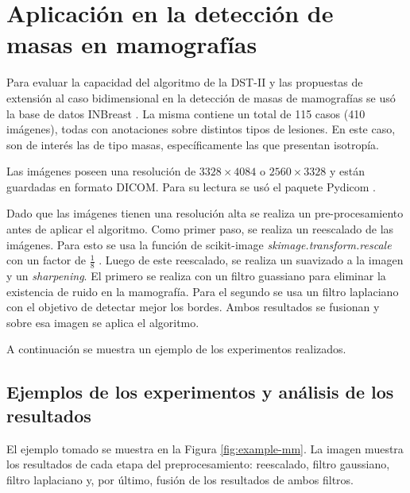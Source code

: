 \section{Aplicación en la detección de masas en mamografías}

Para evaluar la capacidad del algoritmo de la DST-II y las propuestas de extensión al caso bidimensional en
la detección de masas de mamografías se usó la base de datos INBreast \cite{Moreira2012}. La misma 
contiene un total de 115 casos (410 imágenes), todas con anotaciones sobre distintos tipos de lesiones. 
En este caso, son de interés las de tipo masas, específicamente las que presentan isotropía.

Las imágenes poseen una resolución de $3328\times 4084$ o $2560\times 3328$ y están guardadas en formato
DICOM. Para su lectura se usó el paquete Pydicom \cite{darcy_mason_2020_4313150}.

Dado que las imágenes tienen una resolución alta se realiza un pre-procesamiento antes de aplicar el
algoritmo. Como primer paso, se realiza un reescalado de las imágenes. Para esto se usa la función de scikit-image
\textit{skimage.transform.rescale} con un factor de $\frac{1}{8}$ \cite{skimage-transform}. Luego de este reescalado,
se realiza un suavizado a la imagen y un \textit{sharpening}. El primero se realiza con un filtro guassiano
para eliminar la existencia de ruido en la mamografía. Para el segundo se usa un filtro laplaciano con el objetivo
de detectar mejor los bordes. Ambos resultados se fusionan y sobre esa imagen se aplica el algoritmo.

A continuación se muestra un ejemplo de los experimentos realizados.

\subsection{Ejemplos de los experimentos y análisis de los resultados}

El ejemplo tomado se muestra en la Figura \ref{fig:example-mm}. La imagen muestra los resultados de cada etapa 
del preprocesamiento: reescalado, filtro gaussiano, filtro laplaciano y, por último, fusión de los
resultados de ambos filtros.

